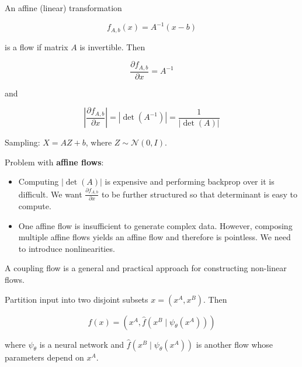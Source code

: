 \documentclass{report}
\begin{document}
\begin{definition}
    An affine (linear) transformation

    $$
    f_{A, b}(x)=A^{-1}(x-b)
    $$

    is a flow if matrix $A$ is invertible. Then

    $$
    \frac{\partial f_{A, b}}{\partial x}=A^{-1}
    $$

    and

    $$
    \left|\frac{\partial f_{A, b}}{\partial x}\right|=\left|\operatorname{det}\left(A^{-1}\right)\right|=\frac{1}{|\operatorname{det}(A)|}
    $$

    Sampling: $X=A Z+b$, where $Z \sim \mathcal{N}(0, I)$.

    Problem with \textbf{affine flows}:

    \begin{itemize}
        \item Computing $|\operatorname{det}(A)|$ is expensive and performing backprop over it is difficult. We want $\frac{\partial f_{A, b}}{\partial x}$ to be further structured so that determinant is easy to compute.
        \item One affine flow is insufficient to generate complex data. However, composing multiple affine flows yields an affine flow and therefore is pointless. We need to introduce nonlinearities.
    \end{itemize}
\end{definition}

\par\noindent\textcolor{gray}{\hdashrule{\textwidth}{0.4pt}{1pt 2pt}}

\begin{definition}
    A coupling flow is a general and practical approach for constructing non-linear flows.

    Partition input into two disjoint subsets $x=\left(x^{A}, x^{B}\right)$. Then

    $$
    f(x)=\left(x^{A}, \hat{f}\left(x^{B} \mid \psi_{\theta}\left(x^{A}\right)\right)\right)
    $$

    where $\psi_{\theta}$ is a neural network and $\hat{f}\left(x^{B} \mid \psi_{\theta}\left(x^{A}\right)\right)$ is another flow whose parameters depend on $x^{A}$.
\end{definition}
\end{document}
